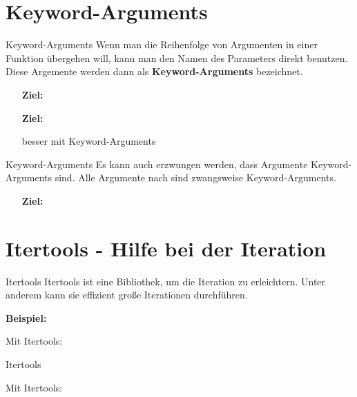 \section{Keyword-Arguments}
\begin{frame}{Keyword-Arguments}
	Wenn man die Reihenfolge von Argumenten in einer Funktion übergehen will, kann man den Namen des Parameters direkt benutzen. Diese Argemente werden dann als \textbf{Keyword-Arguments} bezeichnet.
	
	
	\begin{itemize}
		\item[\textbf{Ziel:}] 
		
		\item[\textbf{Ziel:}] 
		
		besser mit Keyword-Arguments
		
	\end{itemize}
\end{frame}

\begin{frame}{Keyword-Arguments}
	Es kann auch erzwungen werden, dass Argumente Keyword-Arguments sind. Alle Argumente nach \codeline{, *, } sind zwangsweise Keyword-Arguments.
	\linebreak
	
	\begin{itemize}
		\item[\textbf{Ziel:}] 
		
	\end{itemize}
\end{frame}

\section{Itertools - Hilfe bei der Iteration}
\begin{frame}{Itertools}
	Itertools ist eine Bibliothek, um die Iteration zu erleichtern. Unter anderem kann sie effizient große Iterationen durchführen.
	
	
	
	\textbf{Beispiel:}
	
	
	Mit Itertools:
	
\end{frame}

\begin{frame}{Itertools}
	
	
	Mit Itertools:
	
\end{frame}



